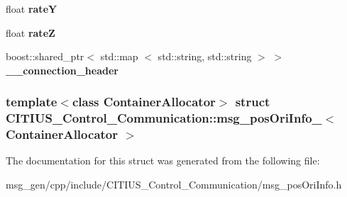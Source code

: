 \begin{DoxyCompactItemize}
\item 
\hypertarget{struct_c_i_t_i_u_s___control___communication_1_1msg__pos_ori_info___a760a5b7f45be6f0e0f4f3b15255446f1}{float {\bfseries rate\-Y}}\label{struct_c_i_t_i_u_s___control___communication_1_1msg__pos_ori_info___a760a5b7f45be6f0e0f4f3b15255446f1}

\item 
\hypertarget{struct_c_i_t_i_u_s___control___communication_1_1msg__pos_ori_info___af69b5e849c6394d13e68dad27e2b945c}{float {\bfseries rate\-Z}}\label{struct_c_i_t_i_u_s___control___communication_1_1msg__pos_ori_info___af69b5e849c6394d13e68dad27e2b945c}

\item 
\hypertarget{struct_c_i_t_i_u_s___control___communication_1_1msg__pos_ori_info___ab09bba21249c24d5fe6b8fe9a4fadf8d}{boost\-::shared\-\_\-ptr$<$ std\-::map\*
$<$ std\-::string, std\-::string $>$ $>$ {\bfseries \-\_\-\-\_\-connection\-\_\-header}}\label{struct_c_i_t_i_u_s___control___communication_1_1msg__pos_ori_info___ab09bba21249c24d5fe6b8fe9a4fadf8d}

\end{DoxyCompactItemize}
\subsubsection*{template$<$class Container\-Allocator$>$ struct C\-I\-T\-I\-U\-S\-\_\-\-Control\-\_\-\-Communication\-::msg\-\_\-pos\-Ori\-Info\-\_\-$<$ Container\-Allocator $>$}



\-The documentation for this struct was generated from the following file\-:\begin{DoxyCompactItemize}
\item 
msg\-\_\-gen/cpp/include/\-C\-I\-T\-I\-U\-S\-\_\-\-Control\-\_\-\-Communication/msg\-\_\-pos\-Ori\-Info.\-h\end{DoxyCompactItemize}
